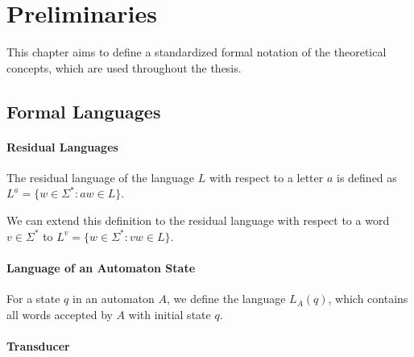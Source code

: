 \chapter{Preliminaries}\label{chapter:preliminaries}
This chapter aims to define a standardized formal notation of the theoretical concepts, which are used throughout the thesis.


\section{Formal Languages}

\subsubsection{Residual Languages}

The residual language of the language $L$ with respect to a letter $a$ is defined as \break
$L^{a} = \{ w \in \Sigma^{*} : aw \in L \}$.

We can extend this definition to the residual language with respect to a word $v \in \Sigma^{*}$ to \break
$L^{v} = \{ w \in \Sigma^{*} : vw \in L \}$.

\subsubsection{Language of an Automaton State}

For a state $q$ in an automaton $A$, we define the language $L_{A}(q)$, which contains all words accepted by $A$ with initial state $q$.

\subsubsection{Transducer}

